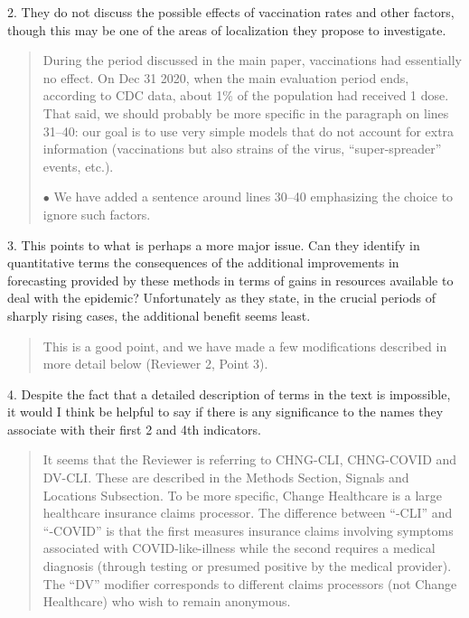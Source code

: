 \documentclass[11pt]{article}
\newenvironment{resp}{\begin{quote}\color{cobalt}}{\end{quote}}
\begin{document}
  2. They do not discuss the possible effects of vaccination rates and other
  factors, though this may be one of the areas of localization they propose to
  investigate.



\begin{resp}
  During the period discussed in the main paper, vaccinations had essentially no
  effect. On Dec 31 2020, when the main evaluation period ends,  according to
  CDC data, about 1\% of the population 
  had received 1 dose. That said, we should probably be more specific in the
  paragraph on lines 31--40: our goal is to use very simple models that do not
  account for extra information (vaccinations but also strains of the virus,
  ``super-spreader'' events, etc.).

  $\bullet$ We have added a sentence around lines 30--40 emphasizing the choice
  to ignore such factors.
\end{resp}


  3. This points to what is perhaps a more major issue. Can they identify in
  quantitative terms the consequences of the additional improvements in
  forecasting provided by these methods in terms of gains in resources available
  to deal with the epidemic? Unfortunately as they state, in the crucial periods
  of sharply rising cases, the additional benefit seems least.


\begin{resp}
  This is a good point, and we have made a few modifications described in more
  detail below (Reviewer 2, Point 3).
\end{resp}



  4. Despite the fact that a detailed description of terms in the text is
  impossible, it would I think be helpful to say if there is any significance to
  the names they associate with their first 2 and 4th indicators.


\begin{resp}
  It seems that the Reviewer is referring to CHNG-CLI, CHNG-COVID and DV-CLI. These are
  described in the Methods Section, Signals and Locations Subsection. To be more
  specific, Change 
  Healthcare is a large healthcare insurance claims processor. The difference
  between ``-CLI'' and ``-COVID'' is that the first measures insurance
  claims involving symptoms
  associated with COVID-like-illness  while the second requires a medical
  diagnosis (through 
  testing or presumed positive by the medical provider). The ``DV'' modifier
  corresponds to different claims processors (not Change Healthcare) who wish to
  remain anonymous.

\end{resp}
\end{document}
